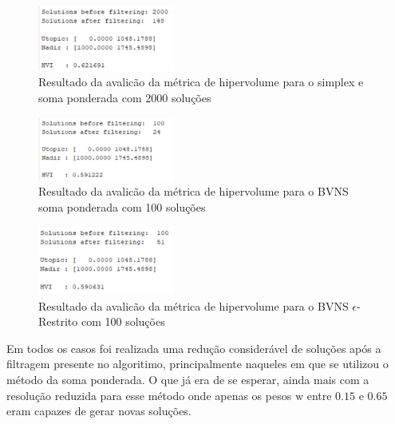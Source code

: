 \documentclass[
	12pt,				%
	oneside,			%
	a4paper,			%
	chapter=TITLE,
	sumario=tradicional,
	english,			%
	brazil				%
]{abntex2}
\begin{document}
\begin{figure}[h!]
	\caption{\label{fig:simplex2000HVI}Resultado da avalicão da métrica de hipervolume para o simplex e soma ponderada com 2000 soluções}
	\begin{center}
    \includegraphics[width=0.4\textwidth,trim=1 1 1 1,clip]{simplex2000HVI.png}
	\end{center}
\end{figure}

\begin{figure}[h!]
	\caption{\label{fig:somaPonderadaHVI}Resultado da avalicão da métrica de hipervolume para o BVNS soma ponderada com 100 soluções}
	\begin{center}
    \includegraphics[width=0.4\textwidth,trim=1 1 1 1,clip]{somaPonderadaHVI.png}
	\end{center}
\end{figure}

\begin{figure}[h!]
	\caption{\label{fig:eRestritoHVI}Resultado da avalicão da métrica de hipervolume para o BVNS $\epsilon$-Restrito com 100 soluções}
	\begin{center}
    \includegraphics[width=0.4\textwidth,trim=1 1 1 1,clip]{erestritoHVI.png}
	\end{center}
\end{figure}

Em todos os casos foi realizada uma redução considerável de soluções após a filtragem presente no algoritimo, principalmente naqueles em que se utilizou o método da soma ponderada.
O que já era de se esperar, ainda mais com a resolução reduzida para esse método onde apenas os pesos $\mathrm{w}$ entre $0.15$ e $0.65$ eram capazes de gerar novas soluções.
\end{document}
